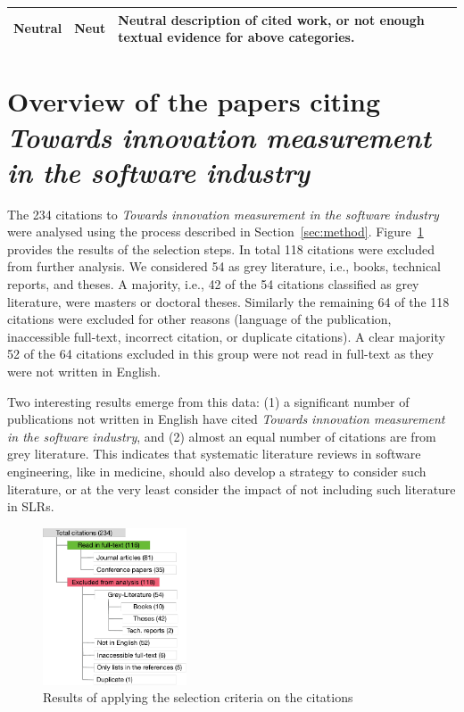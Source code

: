 \documentclass[sigconf,review]{acmart}
\newcommand{\theArticle}{\textit{Towards innovation measurement in the software industry}}
\begin{document}
\begin{table}
\begin{tabular}{llp{12cm}}
		\midrule
		Neutral             & Neut         & Neutral description of cited work, or not enough textual evidence for above categories.\\
		\bottomrule
	\end{tabular}
\end{table}

\section{Overview of the papers citing \theArticle}\label{sec:whocites} %

The 234 citations to \theArticle{} were analysed using the process described in Section~\ref{sec:method}. Figure~\ref{fig:selection} provides the results of the selection steps. In total 118 citations were excluded from further analysis. We considered 54 as grey literature, i.e., books, technical reports, and theses. A majority, i.e., 42 of the 54 citations classified as grey literature, were masters or doctoral theses. Similarly the remaining 64 of the 118 citations were excluded for other reasons (language of the publication, inaccessible full-text, incorrect citation, or duplicate citations). A clear majority 52 of the 64 citations excluded in this group were not read in full-text as they were not written in English.

Two interesting results emerge from this data: (1) a significant number of publications not written in English have cited \theArticle, and (2) almost an equal number of citations are from grey literature. This indicates that systematic literature reviews in software engineering, like in medicine, should also develop a strategy to consider such literature, or at the very least consider the impact of not including such literature in SLRs.

\begin{figure}
	\begin{center}
		\includegraphics[width=0.38\textwidth,height=\textheight,keepaspectratio]{Figures/Citations.pdf}
	\end{center}
	\caption{Results of applying the selection criteria on the citations}
	\label{fig:selection}
\end{figure}
\end{document}
